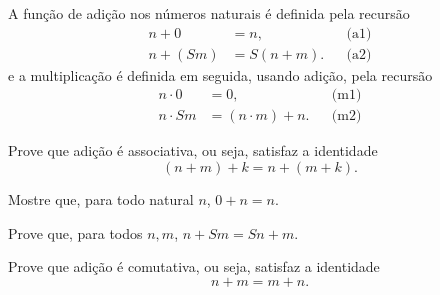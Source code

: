 \begin{definition}
	A função de adição nos números naturais é definida pela recursão
	$$
		\begin{aligned}
			n + 0 &= n, && \text{(a1)}\\
			n + (Sm) &= S(n + m). && \text{(a2)}
		\end{aligned}
	$$
	e a multiplicação é definida em seguida, usando adição, pela recursão
	$$
		\begin{aligned}
			n \cdot 0 &= 0, && \text{(m1)}\\
			n \cdot Sm &= (n \cdot m) + n. && \text{(m2)}
		\end{aligned}
	$$
\end{definition}

\begin{exercise}
	Prove que adição é associativa, ou seja, satisfaz a identidade
	$$
		(n + m) + k = n + (m + k).
	$$
\end{exercise}

\begin{exercise}
	Mostre que, para todo natural $n$, $0 + n = n$.
\end{exercise}

\begin{exercise}
	Prove que, para todos $n, m$, $n + Sm = Sn + m$.
\end{exercise}

\begin{exercise}
	Prove que adição é comutativa, ou seja, satisfaz a identidade
	$$
		n + m = m + n.
	$$
\end{exercise}
